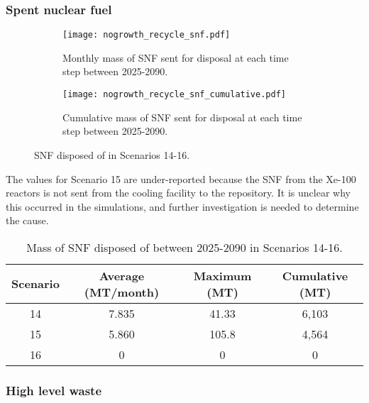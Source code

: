 \subsubsection{Spent nuclear fuel}

\begin{figure}[h!]
    \centering
    \begin{subfigure}[b]{0.49\textwidth}
        \centering
        \texttt{[image: nogrowth\_recycle\_snf.pdf]}
        \caption{Monthly mass of SNF sent for disposal 
        at each time step between 2025-2090.}
        \label{fig:nogrowth_recycle_snf_all}
    \end{subfigure}
    \hfill
    \begin{subfigure}[b]{0.49\textwidth}
        \centering
        \texttt{[image: nogrowth\_recycle\_snf\_cumulative.pdf]}
        \caption{Cumulative mass of SNF sent for disposal 
        at each time step between 2025-2090.}
        \label{fig:nogrowth_recycle_snf_cumulative}
    \end{subfigure}
       \caption{\gls{SNF} disposed of in Scenarios 14-16.}
       \label{fig:nogrowth_recycle_snf}
\end{figure}

The values for Scenario 15 are under-reported because the \gls{SNF} from 
the Xe-100 reactors is not sent from the cooling facility 
to the repository. It is unclear why this occurred in the simulations, 
and further investigation is needed to determine the cause. 

\begin{table}[h!]
    \centering 
    \caption{Mass of SNF disposed of between 2025-2090 in 
    Scenarios 14-16.}
    \label{tab:snf_14-16}
    \begin{tabular}{c c c c}
        \hline 
        Scenario & Average (MT/month) & Maximum (MT) & Cumulative (MT) \\
        \hline
        14 & 7.835 & 41.33 & 6,103\\
        15 & 5.860 & 105.8 & 4,564\\
        16 & 0 & 0 & 0 \\
        \hline
    \end{tabular}
\end{table}

\subsubsection{High level waste}


